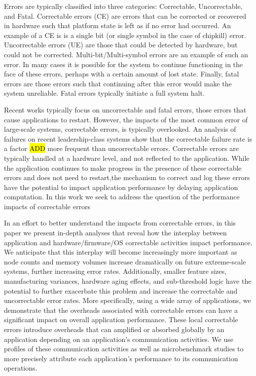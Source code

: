 Errors are typically classified into three categories: Correctable,
Uncorrectable, and Fatal. Correctable errors (CE) are errors that can be
corrected or recovered in hardware such that platform state is left as if no
error had occurred.  An example of a CE is is a single bit (or single symbol in
the case of chipkill) error.  Uncorrectable errors (UE) are those that could be
detected by hardware, but could not be corrected.  Multi-bit/Multi-symbol errors
are an example of such an error.  In many cases it is possible for the system to
continue functioning in the face of these errors, perhaps with a certain amount
of lost state.  Finally, fatal errors are those errors such that continuing
after this error would make the system unreliable.  Fatal errors typically
initiate a full system halt.

Recent works typically focus on uncorrectable and fatal errors, those errors that cause
applications to restart.  However, the impacts of the most common error of
large-scale systems, correctable errors, is typically overlooked. An analysis of
failures on recent leadership-class systems show that the correctable failure
rate is a factor \hl{ADD} more frequent than uncorrectable errors.  Correctable
errors are typically handled at a hardware level, and not reflected to the
application.  While the application continues to make progress in the presence
of these correctable errors and does not need to restart,the mechanism to
correct and log these errors have the potential to impact application
performance by delaying application computation. In this work we seek to address
the question of the performance impacts of correctable errors



In an effort to better understand the impacts from correctable errors, in this
paper we present in-depth analyses that reveal how the interplay between
application and hardware/firmware/OS correctable activities impact performance.
We anticipate that this interplay will become increasingly more important as
node counts and memory volumes increase dramatically on future extreme-scale
systems, further increasing error rates.  Additionally, smaller feature sizes,
manufacturing variances, hardware aging effects, and sub-threshold logic have
the potential to further exacerbate this problem and increase the correctable
and uncorrectable error rates.  More specifically, using a wide array of
applications, we demonstrate that the overheads associated with  correctable
errors can have a significant impact on overall application performance.  These
local correctable errors introduce overheads that can amplified or absorbed
globally by an application depending on an application's communication
activities.  We use profiles of these communication activities as well as
microbenchmark studies to more precisely attribute each application's
performance to its communication operations.

